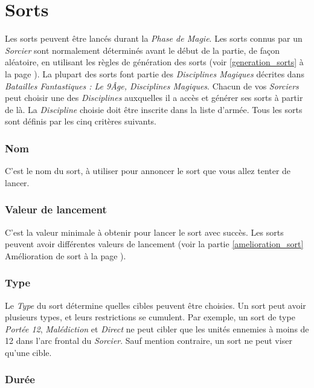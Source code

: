 \section{Sorts}

Les sorts peuvent être lancés durant la \emph{Phase de Magie}. Les sorts connus par un \emph{Sorcier} sont normalement déterminés avant le début de la partie, de façon  aléatoire, en utilisant les règles de génération des sorts (voir \ref{generation_sorts} à la page \pageref{generation_sorts}). La plupart des sorts font partie des \emph{Disciplines Magiques} décrites dans \emph{Batailles Fantastiques : Le 9\ieme Âge, Disciplines Magiques}. Chacun de vos \emph{Sorciers} peut choisir une des \emph{Disciplines} auxquelles il a accès et générer ses sorts à partir de là. La \emph{Discipline} choisie doit être inscrite dans la liste d'armée. Tous les sorts sont définis par les cinq critères suivants.

\subsubsection*{Nom} 

C'est le nom du sort, à utiliser pour annoncer le sort que vous allez tenter de lancer.

\subsubsection*{Valeur de lancement} 

C'est la valeur minimale à obtenir pour lancer le sort avec succès. Les sorts peuvent avoir différentes valeurs de lancement (voir la partie \ref{amelioration_sort} Amélioration de sort à la page \pageref{amelioration_sort}).

\subsubsection*{Type}

Le \emph{Type} du sort détermine quelles cibles peuvent être choisies. Un sort peut avoir plusieurs types, et leurs restrictions se cumulent. Par exemple, un sort de type \emph{Portée 12{\pouce}}, \emph{Malédiction} et \emph{Direct} ne peut cibler que les unités ennemies à moins de 12{\pouce} dans l'arc frontal du \emph{Sorcier}. Sauf mention contraire, un sort ne peut viser qu'une cible.

\subsubsection*{Durée}

